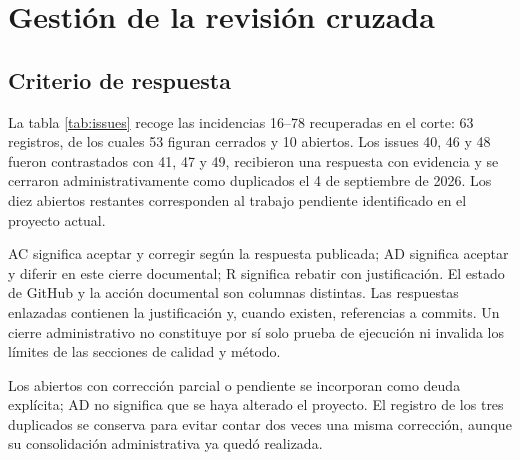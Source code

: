 \documentclass[12pt,a4paper]{article}
\newcommand{\seccion}[1]{\section{#1}}
\begin{document}
\seccion{Gestión de la revisión cruzada}
\subsection{Criterio de respuesta}
La tabla \ref{tab:issues} recoge las incidencias 16--78 recuperadas en el corte: 63 registros, de los cuales 53 figuran cerrados y 10 abiertos. Los issues 40, 46 y 48 fueron contrastados con 41, 47 y 49, recibieron una respuesta con evidencia y se cerraron administrativamente como duplicados el 4 de septiembre de 2026. Los diez abiertos restantes corresponden al trabajo pendiente identificado en el proyecto actual.

AC significa aceptar y corregir según la respuesta publicada; AD significa aceptar y diferir en este cierre documental; R significa rebatir con justificación. El estado de GitHub y la acción documental son columnas distintas. Las respuestas enlazadas contienen la justificación y, cuando existen, referencias a commits. Un cierre administrativo no constituye por sí solo prueba de ejecución ni invalida los límites de las secciones de calidad y método.

Los abiertos con corrección parcial o pendiente se incorporan como deuda explícita; AD no significa que se haya alterado el proyecto. El registro de los tres duplicados se conserva para evitar contar dos veces una misma corrección, aunque su consolidación administrativa ya quedó realizada.
\end{document}
